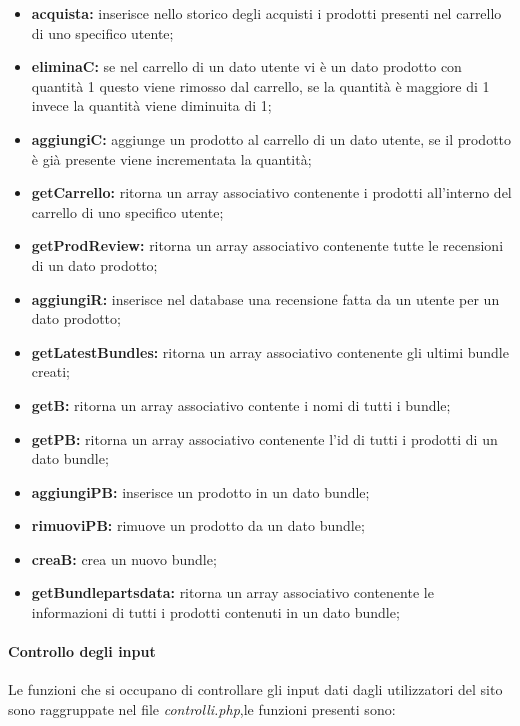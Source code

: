 \begin{itemize}
	\item \textbf{acquista:} inserisce nello storico degli acquisti i prodotti presenti nel carrello di uno specifico utente;
	\item \textbf{eliminaC:} se nel carrello di un dato utente vi è un dato prodotto con quantità 1 questo viene rimosso dal carrello, se la quantità è maggiore di 1 invece la quantità viene diminuita di 1;
	\item \textbf{aggiungiC:} aggiunge un prodotto al carrello di un dato utente, se il prodotto è già presente viene incrementata la quantità;
    \item \textbf{getCarrello:} ritorna un array associativo contenente i prodotti all'interno del carrello di uno specifico utente;
	\item \textbf{getProdReview:} ritorna un array associativo contenente tutte le recensioni di un dato prodotto;
	\item \textbf{aggiungiR:} inserisce nel database una recensione fatta da un utente per un dato prodotto;
	\item \textbf{getLatestBundles:} ritorna un array associativo contenente gli ultimi bundle creati; 
	\item \textbf{getB:} ritorna un array associativo contente i nomi di tutti i bundle;
	\item \textbf{getPB:} ritorna un array associativo contenente l'id di tutti i prodotti di un dato bundle;
	\item \textbf{aggiungiPB:} inserisce un prodotto in un dato bundle;
	\item \textbf{rimuoviPB:} rimuove un prodotto da un dato bundle;
	\item \textbf{creaB:} crea un nuovo bundle;
	\item \textbf{getBundlepartsdata:} ritorna un array associativo contenente le informazioni di tutti i prodotti contenuti in un dato bundle;
\end{itemize}

\paragraph{Controllo degli input} \Spazio
Le funzioni che si occupano di controllare gli input dati dagli utilizzatori del sito sono raggruppate nel file \textit{controlli.php},le funzioni presenti sono:

